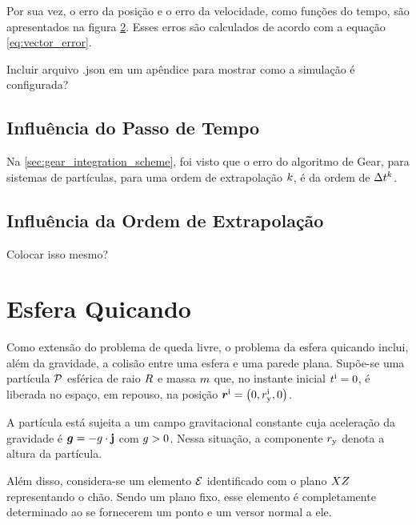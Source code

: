 \begin{figure}[h]
{\begin{center}
\begin{subfigure}[t]{\smallresultsfigwidth}
			\caption{}
			\label{subfig:velocity_error}
		\end{subfigure}
	\end{center}
	}
	\label{fig:falling_sphere_error}
	\sourceMe
\end{figure}

Por sua vez, o erro da posição e o erro da velocidade, como funções do tempo, são apresentados na figura \ref{fig:falling_sphere_error}. Esses erros são calculados de acordo com a equação \eqref{eq:vector_error}.

\alert{Incluir arquivo .json em um apêndice para mostrar como a simulação é configurada?}

\subsection{Influência do Passo de Tempo}

Na \autoref{sec:gear_integration_scheme}, foi visto que o erro do algoritmo de Gear, para sistemas de partículas, para uma ordem de extrapolação \(k\), é da ordem de \(\Delta t_{}^{k}\).

\subsection{Influência da Ordem de Extrapolação} \alert{Colocar isso mesmo?}

\section{Esfera Quicando}

Como extensão do problema de queda livre, o problema da esfera quicando inclui, além da gravidade, a colisão entre uma esfera e uma parede plana. Supõe-se uma partícula \(\mathcal{P}\) esférica de raio \(R\) e massa \(m\) que, no instante inicial \(t^{\text{i}}=0\), é liberada no espaço, em repouso, na posição \(\initial{\position} = \explicitVector{0}{\initial{\yComponent{\positionScalar}}}{0}\).

A partícula está sujeita a um campo gravitacional constante cuja aceleração da gravidade é \(\bm{g} = -g\cdot\mathbf{j}\) com \(g>0\). Nessa situação, a componente \({r}_{\text{y}}\) denota a altura da partícula.

Além disso, considera-se um elemento \(\mathcal{E}\) identificado com o plano \(XZ\) representando o chão. Sendo um plano fixo, esse elemento é completamente determinado ao se fornecerem um ponto e um versor normal a ele. 

